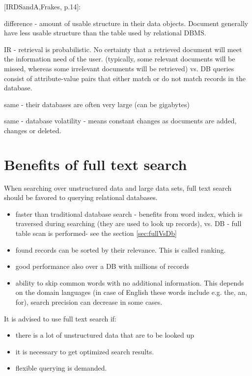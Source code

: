 {[}IRDSandA,Frakes, p.14{]}:

difference - amount of usable structure in their data objects. Document
generally have less usable structure than the table used by relational
DBMS.

IR - retrieval is probabilistic. 
No certainty that a retrieved document will meet the information need of the user. 
(typically, some relevant documents will be missed, whereas some irrelevant documents will be
retrieved) vs. DB queries consist of attribute-value pairs that either
match or do not match records in the database.

same - their databases are often very large (can be gigabytes)

same - database volatility - means constant changes as documents are
added, changes or deleted.


\section{Benefits of full text search}

When searching over unstructured data and large data sets, full text
search should be favored to querying relational databases.
\begin{itemize}
\item faster than traditional database search - benefits from word index,
which is traversed during searching (they are used to look up records),
vs. DB - full table scan is performed- see the section \ref{sec:fullVsDb}
\item found records can be sorted by their relevance. This is called ranking.
\item good performance also over a DB with millions of records
\item ability to skip common words with no additional information. This
depends on the domain languages (in case of English these words include
e.g. the, an, for), search precision can decrease in some cases. 
\end{itemize}
It is advised to use full text search if:
\begin{itemize}
	\item there is a lot of unstructured data that are to be looked up
	\item it is necessary to get optimized search results.
	\item flexible querying is demanded.
\end{itemize}

%


